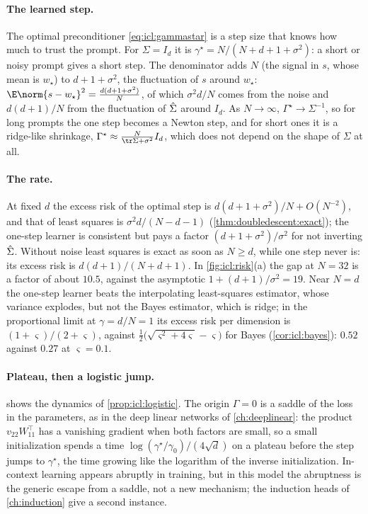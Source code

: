 \begin{refsection}
\paragraph{The learned step.} The optimal preconditioner \eqref{eq:icl:gammastar} is a step size that knows how much to trust the prompt. For $\Sigma=I_d$ it is $\gamma^\star=N/(N+d+1+\sigma^2)$: a short or noisy prompt gives a short step. The denominator adds $N$ (the signal in $s$, whose mean is $w_\star$) to $d+1+\sigma^2$, the fluctuation of $s$ around $w_\star$: $\E\norm{s-w_\star}^2=\frac{d(d+1+\sigma^2)}N$, of which $\sigma^2d/N$ comes from the noise and $d(d+1)/N$ from the fluctuation of $\hat\Sigma$ around $I_d$. As $N\to\infty$, $\Gamma^\star\to\Sigma^{-1}$, so for long prompts the one step becomes a Newton step, and for short ones it is a ridge-like shrinkage, $\Gamma^\star\approx\frac N{\tr\Sigma+\sigma^2}I_d$, which does not depend on the shape of $\Sigma$ at all.

\paragraph{The rate.} At fixed $d$ the excess risk of the optimal step is $d(d+1+\sigma^2)/N+O(N^{-2})$, and that of least squares is $\sigma^2d/(N-d-1)$ (\cref{thm:doubledescent:exact}); the one-step learner is consistent but pays a factor $(d+1+\sigma^2)/\sigma^2$ for not inverting $\hat\Sigma$. Without noise least squares is exact as soon as $N\ge d$, while one step never is: its excess risk is $d(d+1)/(N+d+1)$. In \cref{fig:icl:risk}(a) the gap at $N=32$ is a factor of about $10.5$, against the asymptotic $1+(d+1)/\sigma^2=19$. Near $N=d$ the one-step learner beats the interpolating least-squares estimator, whose variance explodes, but not the Bayes estimator, which is ridge; in the proportional limit at $\gamma=d/N=1$ its excess risk per dimension is $(1+\varsigma)/(2+\varsigma)$, against $\frac12\bigl(\sqrt{\varsigma^2+4\varsigma}-\varsigma\bigr)$ for Bayes (\cref{cor:icl:bayes}): $0.52$ against $0.27$ at $\varsigma=0.1$.

\paragraph{Plateau, then a logistic jump.}  shows the dynamics of \cref{prop:icl:logistic}. The origin $\Gamma=0$ is a saddle of the loss in the parameters, as in the deep linear networks of \cref{ch:deeplinear}: the product $v_{22}W_{11}^\top$ has a vanishing gradient when both factors are small, so a small initialization spends a time $\log(\gamma^\star/\gamma_0)/(4\sqrt d)$ on a plateau before the step jumps to $\gamma^\star$, the time growing like the logarithm of the inverse initialization. In-context learning appears abruptly in training, but in this model the abruptness is the generic escape from a saddle, not a new mechanism; the induction heads of \cref{ch:induction} give a second instance.


\end{refsection}
